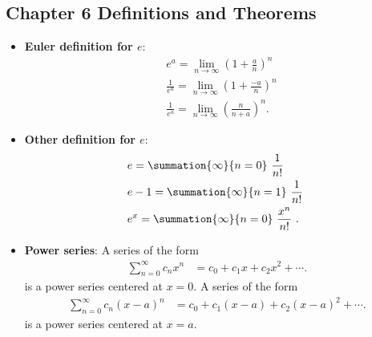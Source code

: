 \documentclass{report}
\begin{document}
\pagebreak \bigbreak \noindent 
\subsection{Chapter 6 Definitions and Theorems}
\begin{itemize}
    \item \textbf{Euler definition for $e$}:
        \begin{align*}
                &e^{a} = \lim\limits_{n \to \infty}{\left(1+\frac{a}{n}\right)^{n}} \\
                &\frac{1}{e^{a}} = \lim\limits_{n \to \infty}{\left(1+\frac{-a}{n}\right)^{n}} \\ 
                &\frac{1}{e^{a}} = \lim\limits_{n \to \infty}{\left(\frac{n}{n+a}\right)^{n}}
            .\end{align*}
        \item \textbf{Other definition for $e $}:
            \begin{align*}
                &e = \summation{\infty}{n=0}\ \frac{1}{n!}\  \\
                &e-1 = \summation{\infty}{n=1}\ \frac{1}{n!}\ \\
                &e^{x} = \summation{\infty}{n=0}\ \frac{x^{n}}{n!}\ 
            .\end{align*}
        \item \textbf{Power series}:
            A series of the form
            \begin{align*}
                \sum_{n=0}^{\infty} c_n x^n &= c_0 + c_1 x + c_2 x^2 + \cdots 
            .\end{align*}
            is a power series centered at \( x = 0 \).
            \bigbreak \noindent 
            A series of the form
            \begin{align*}
                \sum_{n=0}^{\infty} c_n (x - a)^n &= c_0 + c_1 (x - a) + c_2 (x - a)^2 + \cdots 
            .\end{align*}
            is a power series centered at \( x = a \).


\end{itemize}
\end{document}

